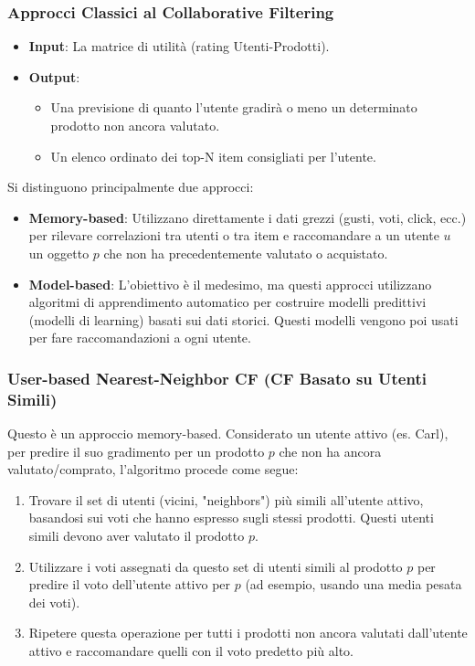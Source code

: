 \documentclass{article}
\begin{document}
\subsubsection{Approcci Classici al Collaborative Filtering}
\begin{itemize}
    \item \textbf{Input}: La matrice di utilità (rating Utenti-Prodotti).
    \item \textbf{Output}:
          \begin{itemize}
              \item Una previsione di quanto l'utente gradirà o meno un determinato prodotto non ancora valutato.
              \item Un elenco ordinato dei top-N item consigliati per l'utente.
          \end{itemize}
\end{itemize}
Si distinguono principalmente due approcci:
\begin{itemize}
    \item \textbf{Memory-based}: Utilizzano direttamente i dati grezzi (gusti, voti, click, ecc.) per rilevare correlazioni tra utenti o tra item e raccomandare a un utente $u$ un oggetto $p$ che non ha precedentemente valutato o acquistato.
    \item \textbf{Model-based}: L'obiettivo è il medesimo, ma questi approcci utilizzano algoritmi di apprendimento automatico per costruire modelli predittivi (modelli di learning) basati sui dati storici. Questi modelli vengono poi usati per fare raccomandazioni a ogni utente.
\end{itemize}

\subsubsection{User-based Nearest-Neighbor CF (CF Basato su Utenti Simili)}
Questo è un approccio memory-based. Considerato un utente attivo (es. Carl), per predire il suo gradimento per un prodotto $p$ che non ha ancora valutato/comprato, l'algoritmo procede come segue:
\begin{enumerate}
    \item Trovare il set di utenti (vicini, "neighbors") più simili all'utente attivo, basandosi sui voti che hanno espresso sugli stessi prodotti. Questi utenti simili devono aver valutato il prodotto $p$.
    \item Utilizzare i voti assegnati da questo set di utenti simili al prodotto $p$ per predire il voto dell'utente attivo per $p$ (ad esempio, usando una media pesata dei voti).
    \item Ripetere questa operazione per tutti i prodotti non ancora valutati dall'utente attivo e raccomandare quelli con il voto predetto più alto.
\end{enumerate}
\end{document}
